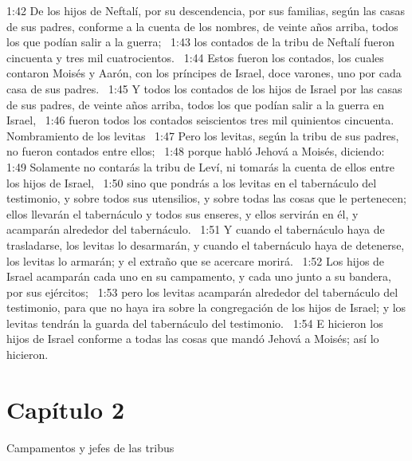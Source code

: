 1:42 De los hijos de Neftalí, por su descendencia, por sus familias, según las casas de sus padres, conforme a la cuenta de los nombres, de veinte años arriba, todos los que podían salir a la guerra;  
1:43 los contados de la tribu de Neftalí fueron cincuenta y tres mil cuatrocientos.  
1:44 Estos fueron los contados, los cuales contaron Moisés y Aarón, con los príncipes de Israel, doce varones, uno por cada casa de sus padres.  
1:45 Y todos los contados de los hijos de Israel por las casas de sus padres, de veinte años arriba, todos los que podían salir a la guerra en Israel,  
1:46 fueron todos los contados seiscientos tres mil quinientos cincuenta.  
Nombramiento de los levitas  
1:47 Pero los levitas, según la tribu de sus padres, no fueron contados entre ellos;  
1:48 porque habló Jehová a Moisés, diciendo:  
1:49 Solamente no contarás la tribu de Leví, ni tomarás la cuenta de ellos entre los hijos de Israel,  
1:50 sino que pondrás a los levitas en el tabernáculo del testimonio, y sobre todos sus utensilios, y sobre todas las cosas que le pertenecen; ellos llevarán el tabernáculo y todos sus enseres, y ellos servirán en él, y acamparán alrededor del tabernáculo.  
1:51 Y cuando el tabernáculo haya de trasladarse, los levitas lo desarmarán, y cuando el tabernáculo haya de detenerse, los levitas lo armarán; y el extraño que se acercare morirá.  
1:52 Los hijos de Israel acamparán cada uno en su campamento, y cada uno junto a su bandera, por sus ejércitos;  
1:53 pero los levitas acamparán alrededor del tabernáculo del testimonio, para que no haya ira sobre la congregación de los hijos de Israel; y los levitas tendrán la guarda del tabernáculo del testimonio.  
1:54 E hicieron los hijos de Israel conforme a todas las cosas que mandó Jehová a Moisés; así lo hicieron.  
\section*{Capítulo 2 }
Campamentos y jefes de las tribus  

